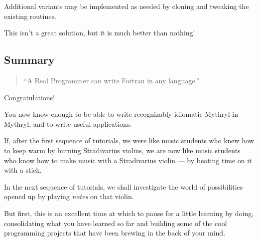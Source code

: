 Additional variants may be implemented as needed by 
cloning and tweaking the existing routines.

This isn't a great solution, but it is much better than nothing!

\cutend*

\subsection{Summary}

\begin{quote}\begin{tiny}
        ``A Real Programmer can write Fortran in any language.''\newline
\newline
\end{tiny}\end{quote}

Congratulations!  

You now know enough to be able to write recognizably idiomatic Mythryl in Mythryl, 
and to write useful applications.

If, after the first sequence of tutorials, we were like music students 
who knew how to keep warm by burning Stradivarius violins, we are now 
like music students who know how to make music with a Stradivarius 
violin --- by beating time on it with a stick.

In the next sequence of tutorials, we shall investigate the world of 
possibilities opened up by playing {\it notes} on that violin.

But first, this is an excellent time at which to pause for a little 
learning by doing, consolidating what you have learned so far and 
building some of the cool programming projects that have been brewing 
in the back of your mind.

\cutend*

